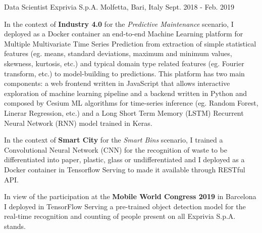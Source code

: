 \begin{cventries}
  \cventry
    {Data Scientist} %
    {Exprivia S.p.A.} %
    {Molfetta, Bari, Italy} %
    {Sept. 2018 - Feb. 2019} %
    {   
      \begin{cvitems} %
        \item {In the context of \textbf{Industry 4.0} for the \textit{Predictive Maintenance} scenario, I deployed as a Docker container an end-to-end Machine Learning platform for Multiple Multivariate Time Series Prediction from extraction of simple statistical features (eg. means, standard deviations, maximum and minimum values, skewness, kurtosis, etc.) and typical domain type related features (eg. Fourier transform, etc.) to model-building to predictions. 
This platform has two main components: a web frontend written in JavaScript that allows interactive exploration of machine learning pipeline and a backend written in Python and composed by Cesium ML algorithms for time-series inference (eg. Random Forest, Linerar Regression, etc.) and a Long Short Term Memory (LSTM) Recurrent Neural Network (RNN) model trained in Keras.}
        \item {In the context of \textbf{Smart City} for the \textit{Smart Bins} scenario, I trained a Convolutional Neural Network (CNN) for the recognition of waste to be differentiated into paper, plastic, glass or undifferentiated and I deployed as a Docker container in Tensorflow Serving to made it available through RESTful API.}
        \item {In view of the participation at the \textbf{Mobile World Congress 2019} in Barcelona I deployed in TensorFlow Serving a pre-trained object detection model for the real-time recognition and counting of people present on all Exprivia S.p.A. stands.}
      \end{cvitems}
    }




\end{cventries}
